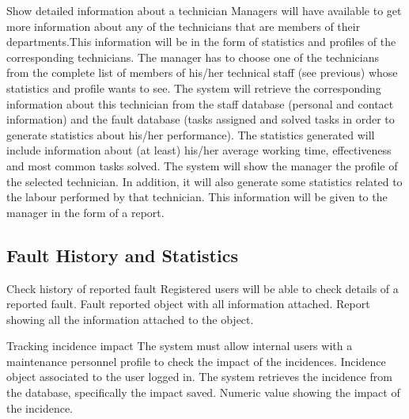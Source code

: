 \begin{requirement}{Show detailed information about a technician}
\reqdesc Managers will have available to get more information about any of the technicians that are members of their departments.This information will be in the form of statistics and profiles of the corresponding technicians.
\reqin The manager has to choose one of the technicians from the complete list of members of his/her technical staff (see previous) whose statistics and profile wants to see.
\reqsteps The system will retrieve the corresponding information about this technician from the staff database (personal and contact information) and the fault database (tasks assigned and solved tasks in order to generate statistics about his/her performance). The statistics generated will include information about (at least) his/her average working time, effectiveness and most common tasks solved.
\reqout The system will show the manager the profile of the selected technician. In addition, it will also generate some statistics related to the labour performed by that technician. This information will be given to the manager in the form of a report.
\end{requirement}



\subsection{Fault History and Statistics}


\begin{requirement}{Check history of reported fault}
\reqdesc Registered users will be able to check details of a reported fault.
\reqin Fault reported object with all information attached.
\reqout Report showing all the information attached to the object.
\end{requirement}
\begin{requirement}{Tracking incidence impact}
\reqdesc The system must allow internal users with a maintenance personnel profile to check the impact of the incidences.
\reqin Incidence object associated to the user logged in.
\reqsteps The system retrieves the incidence from the database, specifically the impact saved.
\reqout Numeric value showing the impact of the incidence.
\end{requirement}

